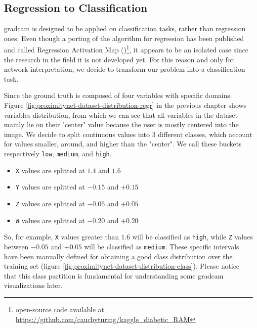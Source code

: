 \subsection{Regression to Classification}
\label{subsec:gradcam-regrtoclass}

\gls{gradcam} is designed to be applied on classification tasks, rather than regression ones. Even though a porting of the algorithm for regression has been published and called Regression Activation Map (\cite{wang2019diabetic})\footnote{open-source code available at \url{https://github.com/cauchyturing/kaggle_diabetic_RAM}}, it appears to be an isolated case since the research in the field it is not developed yet. For this reason and only for network interpretation, we decide to transform our problem into a classification task.

Since the ground truth is composed of four variables with specific domains. Figure \ref{fig:proximitynet-dataset-distribution-regr} in the previous chapter shows variables distribution, from which we can see that all variables in the dataset mainly lie on their "center" value because the user is mostly centered into the image. We decide to split continuous values into 3 different classes, which account for values smaller, around, and higher than the "center". We call these buckets respectively \texttt{low}, \texttt{medium}, and \texttt{high}.

\begin{itemize}
	\item \texttt{X} values are splitted at $1.4$ and $1.6$
	\item \texttt{Y} values are splitted at $-0.15$ and $+0.15$
	\item \texttt{Z} values are splitted at $-0.05$ and $+0.05$
	\item \texttt{W} values are splitted at $-0.20$ and $+0.20$
\end{itemize}

So, for example, \texttt{X} values greater than $1.6$ will be classified as \texttt{high}, while \texttt{Z} values between $-0.05$ and $+0.05$ will be classified as \texttt{medium}. These specific intervals have been manually defined for obtaining a good class distribution over the training set (figure \ref{fig:proximitynet-dataset-distribution-class}). Please notice that this class partition is fundamental for understanding some \gls{gradcam} visualizations later.

